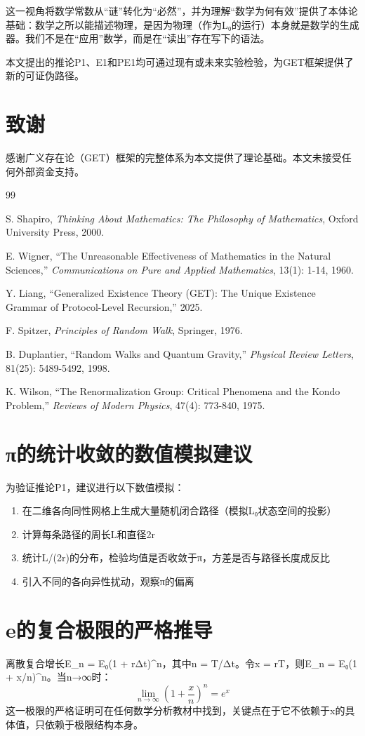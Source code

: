 \documentclass[12pt, a4paper]{article}
\begin{document}
这一视角将数学常数从“谜”转化为“必然”，并为理解“数学为何有效”提供了本体论基础：数学之所以能描述物理，是因为物理（作为L₀的运行）本身就是数学的生成器。我们不是在“应用”数学，而是在“读出”存在写下的语法。

本文提出的推论P1、E1和PE1均可通过现有或未来实验检验，为GET框架提供了新的可证伪路径。

\section*{致谢}

感谢广义存在论（GET）框架的完整体系为本文提供了理论基础。本文未接受任何外部资金支持。

\begin{thebibliography}{99}

S. Shapiro, \emph{Thinking About Mathematics: The Philosophy of Mathematics}, Oxford University Press, 2000.

E. Wigner, ``The Unreasonable Effectiveness of Mathematics in the Natural Sciences,'' \emph{Communications on Pure and Applied Mathematics}, 13(1): 1-14, 1960.

Y. Liang, ``Generalized Existence Theory (GET): The Unique Existence Grammar of Protocol-Level Recursion,'' 2025.

F. Spitzer, \emph{Principles of Random Walk}, Springer, 1976.

B. Duplantier, ``Random Walks and Quantum Gravity,'' \emph{Physical Review Letters}, 81(25): 5489-5492, 1998.

K. Wilson, ``The Renormalization Group: Critical Phenomena and the Kondo Problem,'' \emph{Reviews of Modern Physics}, 47(4): 773-840, 1975.

\end{thebibliography}

\appendix

\section{π的统计收敛的数值模拟建议}

为验证推论P1，建议进行以下数值模拟：

\begin{enumerate}
\item 在二维各向同性网格上生成大量随机闭合路径（模拟L₀状态空间的投影）
\item 计算每条路径的周长L和直径2r
\item 统计L/(2r)的分布，检验均值是否收敛于π，方差是否与路径长度成反比
\item 引入不同的各向异性扰动，观察π的偏离
\end{enumerate}

\section{e的复合极限的严格推导}

离散复合增长E_n = E₀(1 + rΔt)^n，其中n = T/Δt。令x = rT，则E_n = E₀(1 + x/n)^n。当n→∞时：
\[
\lim_{n\to\infty} \left(1 + \frac{x}{n}\right)^n = e^x
\]
这一极限的严格证明可在任何数学分析教材中找到，关键点在于它不依赖于x的具体值，只依赖于极限结构本身。
\end{document}
